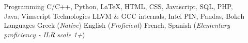 

\begin{cvskills}

  \cvskill
    {Programming}
        {C/C++, Python, \LaTeX, HTML, CSS, Javascript, SQL, PHP, Java, Vimscript}
  \cvskill
    {Technologies} %
		{LLVM \& GCC internals, Intel PIN, Pandas, Bokeh} %
  \cvskill
    {Languages} %
    {Greek (\textit{Native}) \hspace*{7pt} English (\textit{Proficient}) \hspace*{7pt}  French, Spanish (\textit{Elementary proficiency - \href{http://www.govtilr.org/skills/ILRscale1.htm}{ILR scale 1+}})}

\end{cvskills}
